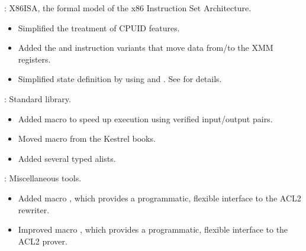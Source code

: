 
\begin{frame}

\implibtitle

:
X86ISA, the formal model of the x86 Instruction Set Architecture.
\begin{itemize}
\item Simplified the treatment of CPUID features.
\item Added the  and  instruction variants
      that move data from/to the XMM registers.
\item Simplified state definition by using
       and . See
       for details.
\end{itemize}

\end{frame}


\begin{frame}

\implibtitle

:
Standard library.
\begin{itemize}
\item Added macro  to speed up execution
      using verified input/output pairs.
\item Moved macro  from the Kestrel books.
\item Added several typed alists.
\end{itemize}

\end{frame}


\begin{frame}

\implibtitle

: Miscellaneous tools.
\begin{itemize}
\item Added macro ,
      which provides a programmatic, flexible interface
      to the ACL2 rewriter.
\item Improved macro ,
      which provides a programmatic, flexible interface
      to the ACL2 prover.
\end{itemize}
\end{frame}



